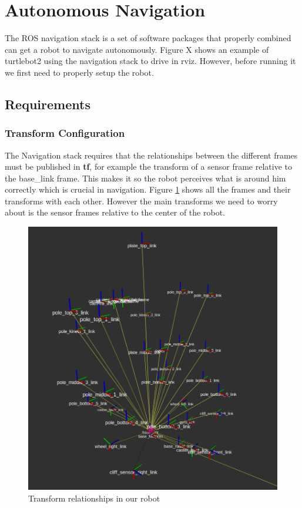 \documentclass[12pt]{article}
\begin{document}
\section{Autonomous Navigation}
The ROS navigation stack is a set of software packages that properly combined can get a robot to navigate autonomously.
Figure X  shows an example of turtlebot2 using the navigation stack to drive in rviz.
However, before running it we first need to properly setup the robot.
\subsection{Requirements}
\subsubsection{Transform Configuration}
The Navigation stack requires that the relationships between the different frames must be published in \textbf{tf}, for example the transform of a sensor frame relative to the  base\_link frame. This makes it so the robot perceives what is around him correctly which is crucial in navigation.
Figure \ref{fig:tf} shows all the frames and their transforms with each other. However the main transforms we need to worry about is the sensor frames relative to the center of the robot.
\begin{figure}[!htb]
    \centering
    \includegraphics[scale=0.25]{tf.png}
    \caption{Transform relationships in our robot}
    \label{fig:tf}
\end{figure}
\end{document}
